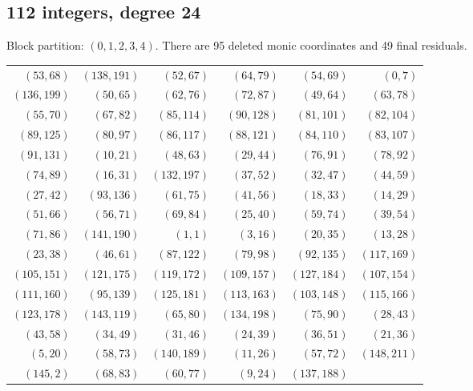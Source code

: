 \subsection{112 integers, degree 24}
Block partition: $(0,1,2,3,4)$.
There are 95 deleted monic coordinates and 49 final residuals.
\begin{center}\small\begin{tabular}{rrrrrr}\toprule
$(53,68)$ & $(138,191)$ & $(52,67)$ & $(64,79)$ & $(54,69)$ & $(0,7)$\\
$(136,199)$ & $(50,65)$ & $(62,76)$ & $(72,87)$ & $(49,64)$ & $(63,78)$\\
$(55,70)$ & $(67,82)$ & $(85,114)$ & $(90,128)$ & $(81,101)$ & $(82,104)$\\
$(89,125)$ & $(80,97)$ & $(86,117)$ & $(88,121)$ & $(84,110)$ & $(83,107)$\\
$(91,131)$ & $(10,21)$ & $(48,63)$ & $(29,44)$ & $(76,91)$ & $(78,92)$\\
$(74,89)$ & $(16,31)$ & $(132,197)$ & $(37,52)$ & $(32,47)$ & $(44,59)$\\
$(27,42)$ & $(93,136)$ & $(61,75)$ & $(41,56)$ & $(18,33)$ & $(14,29)$\\
$(51,66)$ & $(56,71)$ & $(69,84)$ & $(25,40)$ & $(59,74)$ & $(39,54)$\\
$(71,86)$ & $(141,190)$ & $(1,1)$ & $(3,16)$ & $(20,35)$ & $(13,28)$\\
$(23,38)$ & $(46,61)$ & $(87,122)$ & $(79,98)$ & $(92,135)$ & $(117,169)$\\
$(105,151)$ & $(121,175)$ & $(119,172)$ & $(109,157)$ & $(127,184)$ & $(107,154)$\\
$(111,160)$ & $(95,139)$ & $(125,181)$ & $(113,163)$ & $(103,148)$ & $(115,166)$\\
$(123,178)$ & $(143,119)$ & $(65,80)$ & $(134,198)$ & $(75,90)$ & $(28,43)$\\
$(43,58)$ & $(34,49)$ & $(31,46)$ & $(24,39)$ & $(36,51)$ & $(21,36)$\\
$(5,20)$ & $(58,73)$ & $(140,189)$ & $(11,26)$ & $(57,72)$ & $(148,211)$\\
$(145,2)$ & $(68,83)$ & $(60,77)$ & $(9,24)$ & $(137,188)$ & \\
\bottomrule\end{tabular}\end{center}
